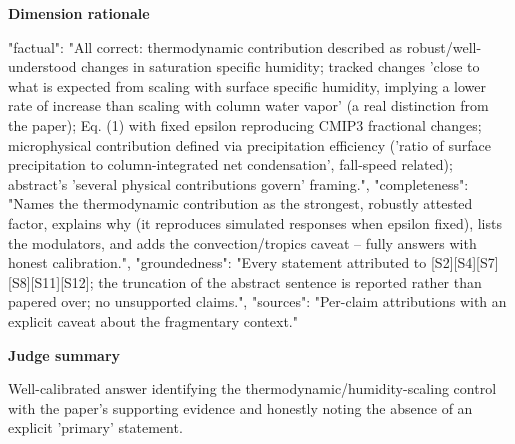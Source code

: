 \documentclass[10pt]{article}
\begin{document}
\textbf{Dimension rationale}
\begin{EvidenceText}
{
  "factual": "All correct: thermodynamic contribution described as robust/well-understood changes in saturation specific humidity; tracked changes 'close to what is expected from scaling with surface specific humidity, implying a lower rate of increase than scaling with column water vapor' (a real distinction from the paper); Eq. (1) with fixed epsilon reproducing CMIP3 fractional changes; microphysical contribution defined via precipitation efficiency ('ratio of surface precipitation to column-integrated net condensation', fall-speed related); abstract's 'several physical contributions govern' framing.",
  "completeness": "Names the thermodynamic contribution as the strongest, robustly attested factor, explains why (it reproduces simulated responses when epsilon fixed), lists the modulators, and adds the convection/tropics caveat -- fully answers with honest calibration.",
  "groundedness": "Every statement attributed to [S2][S4][S7][S8][S11][S12]; the truncation of the abstract sentence is reported rather than papered over; no unsupported claims.",
  "sources": "Per-claim attributions with an explicit caveat about the fragmentary context."
}
\end{EvidenceText}

\textbf{Judge summary}
\begin{EvidenceText}
Well-calibrated answer identifying the thermodynamic/humidity-scaling control with the paper's supporting evidence and honestly noting the absence of an explicit 'primary' statement.
\end{EvidenceText}
\end{document}

